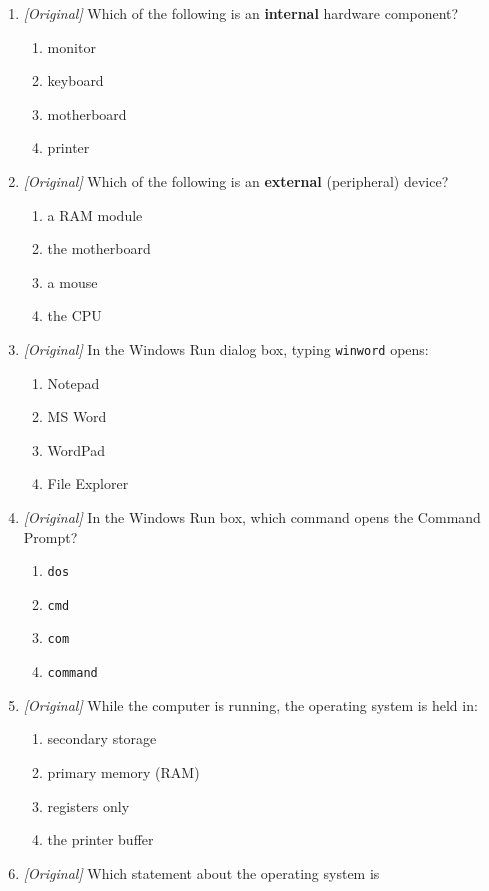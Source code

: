 \documentclass[11pt]{article}
\begin{document}
\begin{enumerate}[label=\textbf{Q\arabic*.}, leftmargin=*]
\item \textit{[Original]} Which of the following is an \textbf{internal}
  hardware component?
  \begin{enumerate}[label=\Alph*.]
    \item monitor
    \item keyboard
    \item motherboard
    \item printer
  \end{enumerate}
\item \textit{[Original]} Which of the following is an \textbf{external}
  (peripheral) device?
  \begin{enumerate}[label=\Alph*.]
    \item a RAM module
    \item the motherboard
    \item a mouse
    \item the CPU
  \end{enumerate}
\item \textit{[Original]} In the Windows Run dialog box, typing
  \texttt{winword} opens:
  \begin{enumerate}[label=\Alph*.]
    \item Notepad
    \item MS Word
    \item WordPad
    \item File Explorer
  \end{enumerate}
\item \textit{[Original]} In the Windows Run box, which command opens the
  Command Prompt?
  \begin{enumerate}[label=\Alph*.]
    \item \texttt{dos}
    \item \texttt{cmd}
    \item \texttt{com}
    \item \texttt{command}
  \end{enumerate}
\item \textit{[Original]} While the computer is running, the operating system
  is held in:
  \begin{enumerate}[label=\Alph*.]
    \item secondary storage
    \item primary memory (RAM)
    \item registers only
    \item the printer buffer
  \end{enumerate}
\item \textit{[Original]} Which statement about the operating system is

\end{enumerate}
\end{document}
